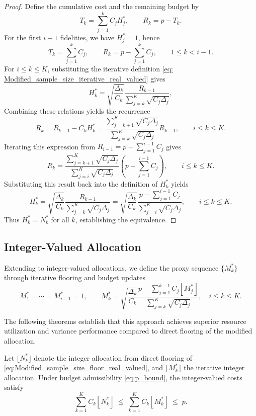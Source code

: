 \begin{proof}
Define the cumulative cost and the remaining budget by
%
\[
T_k = \sum_{j=1}^k C_j H_j^*, 
\qquad 
R_k = p - T_k.
\]
%
For the first $i-1$ fidelities, we have $H_j^* = 1$, hence
%
\[
T_k = \sum_{j=1}^k C_j, \qquad R_k = p - \sum_{j=1}^k C_j, \qquad 1 \le k < i-1.
\]
%
For $i \le k \le K$, substituting the iterative definition \eqref{eq: Modified_sample_size_iterative_real_valued} gives
%
\[
H_k^* 
= \sqrt{\frac{\Delta_k}{C_k}}
  \frac{R_{k-1}}{\sum_{j=k}^{K} \sqrt{C_j \Delta_j}},
\]
%
Combining these relations yields the recurrence
%
\[
R_k = R_{k-1} - C_k H_k^*
=
\frac{\sum_{j=k+1}^{K} \sqrt{C_j \Delta_j}}
       {\sum_{j=k}^{K} \sqrt{C_j \Delta_j}} R_{k-1},
\qquad i \le k \le K.
\]
%
Iterating this expression from $R_{i-1} = p - \sum_{j=1}^{i-1} C_j$ gives
%
\[
R_k 
= 
\frac{\sum_{j=k+1}^{K} \sqrt{C_j \Delta_j}}
       {\sum_{j=i}^{K} \sqrt{C_j \Delta_j}}
  \left( p - \sum_{j=1}^{i-1} C_j \right),
\qquad i \le k \le K.
\]
%
Substituting this result back into the definition of $H_k^*$ yields
%
\[
H_k^*
= \sqrt{\frac{\Delta_k}{C_k}}
  \frac{R_{k-1}}{\sum_{j=k}^{K} \sqrt{C_j \Delta_j}}
= \sqrt{\frac{\Delta_k}{C_k}}
  \frac{p - \sum_{j=1}^{i-1} C_j}
       {\sum_{j=i}^{K} \sqrt{C_j \Delta_j}},
\qquad i \le k \le K.
\]
%
Thus $H_k^* = N_k^*$ for all $k$, establishing the equivalence. 
\end{proof}


\subsection{Integer-Valued Allocation}
Extending to integer-valued allocations, we define the proxy sequence $\{M_k^*\}$ through iterative flooring and budget updates
%
\begin{equation}
    \label{eq:Modified_sample_size_iterative_integer_proxy}
    M_1^*=\cdots=M_{i-1}^*=1, \qquad 
    M_k^*=\sqrt{\frac{\Delta_k}{C_k}}
    \frac{p-\sum_{j=1}^{k-1} C_j\left\lfloor M_j^*\right\rfloor}
         {\sum_{j=k}^{K}\sqrt{C_j\Delta_j}}, \quad i\le k\le K.
\end{equation}
%

The following theorems establish that this approach achieves superior resource utilization and variance performance compared to direct flooring of the modified allocation.


\begin{theorem}
\label{thm:MFMC_modified_integer_cost}
Let $\lfloor N_k^* \rfloor$ denote the integer allocation from direct flooring of \eqref{eq:Modified_sample_size_floor_real_valued}, and $\lfloor M_k^* \rfloor$ the iterative integer allocation. Under budget admissibility \eqref{eq:p_bound}, the integer-valued costs satisfy
\[
\sum_{k=1}^K C_k \left\lfloor N_k^* \right\rfloor\;\le\; \sum_{k=1}^K C_k\left\lfloor M_k^* \right\rfloor \;\le\; p.
\]
\end{theorem}




